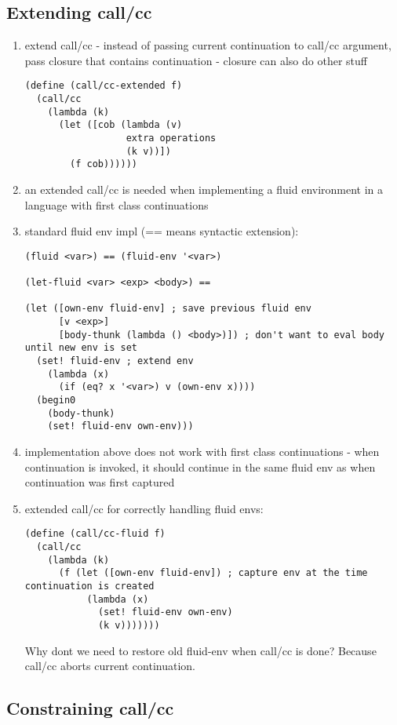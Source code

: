 \documentclass[letterpaper]{llncs}
\begin{document}
\subsection*{Extending call/cc}

\begin{enumerate}
	\item extend call/cc - instead of passing current continuation to call/cc argument, pass closure that contains continuation - closure can also do other stuff
\begin{verbatim}
(define (call/cc-extended f)
  (call/cc
    (lambda (k)
      (let ([cob (lambda (v)
                  extra operations
                  (k v))])
        (f cob))))))
\end{verbatim}
	\item an extended call/cc is needed when implementing a fluid environment in a language with first class continuations
	\item standard fluid env impl (== means syntactic extension):
\begin{verbatim}
(fluid <var>) == (fluid-env '<var>)

(let-fluid <var> <exp> <body>) ==

(let ([own-env fluid-env] ; save previous fluid env
      [v <exp>]
      [body-thunk (lambda () <body>)]) ; don't want to eval body until new env is set
  (set! fluid-env ; extend env
    (lambda (x)
      (if (eq? x '<var>) v (own-env x))))
  (begin0
    (body-thunk)
    (set! fluid-env own-env)))
\end{verbatim}
	\item implementation above does not work with first class continuations - when continuation is invoked, it should continue in the same fluid env as when continuation was first captured
	\item extended call/cc for correctly handling fluid envs:
\begin{verbatim}
(define (call/cc-fluid f)
  (call/cc
    (lambda (k)
      (f (let ([own-env fluid-env]) ; capture env at the time continuation is created
           (lambda (x)
             (set! fluid-env own-env)
             (k v)))))))
\end{verbatim}
Why dont we need to restore old fluid-env when call/cc is done? Because call/cc aborts current continuation.
\end{enumerate}

\subsection*{Constraining call/cc}
\end{document}
